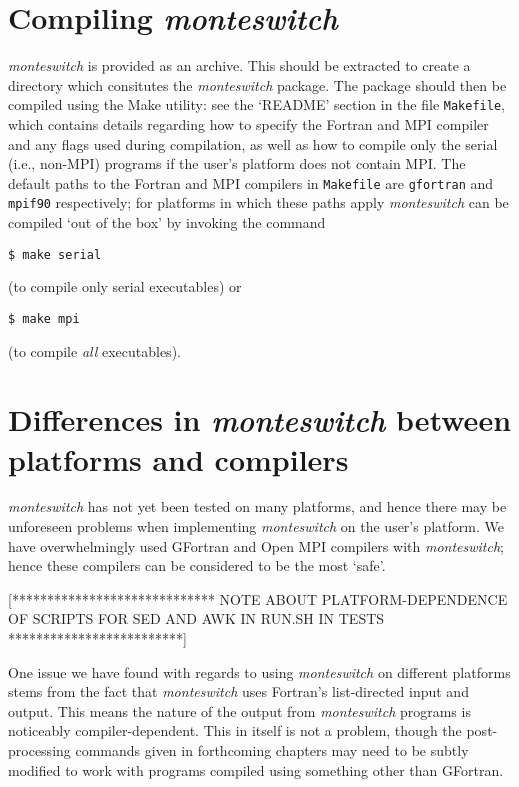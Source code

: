 \documentclass{report}
\begin{document}
\section{Compiling \emph{monteswitch}}
\emph{monteswitch} is provided as an archive. This should be extracted to create a directory which consitutes the \emph{monteswitch} package. The 
package should then be compiled using the Make utility: see the `README' section in the file \texttt{Makefile}, which contains details regarding how to
specify the Fortran and MPI compiler and any flags used during compilation, as well as how to compile only the serial (i.e., non-MPI) programs
if the user's platform does not contain MPI.
The default paths to the Fortran and MPI compilers in \texttt{Makefile} are \texttt{gfortran} and \texttt{mpif90} respectively; for platforms in which
these paths apply \emph{monteswitch} can be compiled `out of the box' by invoking the command 
\begin{verbatim}
$ make serial
\end{verbatim} 
(to compile only serial executables) or 
\begin{verbatim}
$ make mpi
\end{verbatim}
(to compile \emph{all} executables).


\section{Differences in \emph{monteswitch} between platforms and compilers}
\emph{monteswitch} has not yet been tested on many platforms, and hence there may be unforeseen problems when implementing \emph{monteswitch} on
the user's platform. We have overwhelmingly used GFortran and Open MPI compilers with \emph{monteswitch}; hence these compilers can be considered 
to be the most `safe'.

[***************************** NOTE ABOUT PLATFORM-DEPENDENCE OF SCRIPTS FOR SED AND AWK IN RUN.SH IN TESTS *************************]

One issue we have found with regards to using \emph{monteswitch} on different platforms stems from the fact that \emph{monteswitch} uses Fortran's 
list-directed input and output. This means the nature of the output from \emph{monteswitch} programs is noticeably compiler-dependent. This in itself
is not a problem, though the post-processing commands given in forthcoming chapters may need to be subtly modified to work with programs compiled using 
something other than GFortran.
\end{document}
